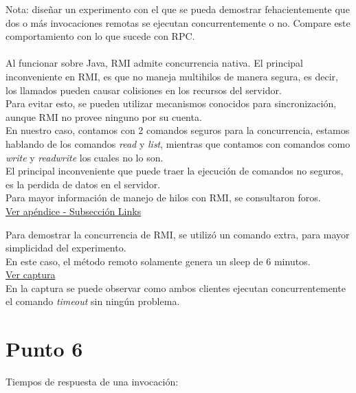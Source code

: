 \documentclass[12pt,journal,compsoc]{IEEEtran}
\begin{document}
Nota: diseñar un experimento con el que se pueda demostrar
fehacientemente que dos o más invocaciones remotas se ejecutan
concurrentemente o no. Compare este comportamiento con lo que sucede con
RPC.\\\\
Al funcionar sobre Java, RMI admite concurrencia nativa.
El principal inconveniente en RMI, es que no maneja multihilos de manera
segura, es decir, los llamados pueden causar colisiones en los recursos
del servidor.\\
Para evitar esto, se pueden utilizar mecanismos conocidos para sincronización,
aunque RMI no provee ninguno por su cuenta.\\
En nuestro caso, contamos con 2 comandos seguros para la concurrencia, estamos
hablando de los comandos \textit{read} y \textit{list}, mientras que contamos con
comandos como \textit{write} y \textit{readwrite} los cuales no lo son.\\
El principal inconveniente que puede traer la ejecución de comandos no seguros, es
la perdida de datos en el servidor.\\
Para mayor información de manejo de hilos con RMI, se consultaron foros.\\
\hyperref[section:links]{Ver apéndice - Subsección Links}

Para demostrar la concurrencia de RMI, se utilizó un comando extra, para
mayor simplicidad del experimento.\\
En este caso, el método remoto solamente genera un sleep de 6 minutos.\\
\hyperref[fig:concurrecia]{Ver captura}\\
En la captura se puede observar como ambos clientes ejecutan concurrentemente
el comando \textit{timeout} sin ningún problema.

\section{Punto 6}

Tiempos de respuesta de una invocación:
\end{document}
